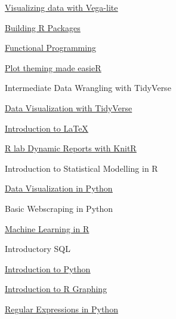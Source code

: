 \href{http://bit.ly/ResBazVisWorkshop}
{\underline{Visualizing data with Vega-lite}}

\href{https://drive.google.com/file/d/1aTmDulXbyPEgAuW7pvNxU6O-RJ-h-c74/view?usp=sharing}
{\underline{Building R Packages}}

\href{https://jcoliver.github.io/learn-r/007-intro-functional-programming.html}
{\underline{Functional Programming}}

\href{https://talks.cpsievert.me/20200429/#1}
{\underline{Plot theming made easieR}}

Intermediate Data Wrangling with TidyVerse

\href{https://jcoliver.github.io/learn-r/012-intro-tidyverse.html}
{\underline{Data Visualization with TidyVerse}}

\href{https://www.dropbox.com/s/nisxf745lzbqfoe/LaTeX_tutorial_documents.zip?dl=0}
{\underline{Introduction to \LaTeX}}

\href{https://jcoliver.github.io/learn-r/005-intro-knitr.html}
{\underline{R lab Dynamic Reports with KnitR}}

Introduction to Statistical Modelling in R 

\href{Towardsdatascience.com/introduction-to-data-visualization-in-python-89a54c97fbed}
{\underline{Data Visualization in Python}}

Basic Webscraping in Python 

\href{https://github.com/keatonwilson/classification_workshop_1}
{\underline{Machine Learning in R}}

Introductory SQL 

\href{https://github.com/bjoyce3/titanic_data_exploration}
{\underline{Introduction to Python}}

\href{https://jcoliver.github.io/learn-r/004-intro-ggplot.html}
{\underline{Introduction to R Graphing}}

\href{https://docs.google.com/presentation/d/1Z3gCvz-FYMJw6ImvWYR2--oad7AZP3H90suFMqhLs6M/edit}{\underline{Regular Expressions in Python}}
